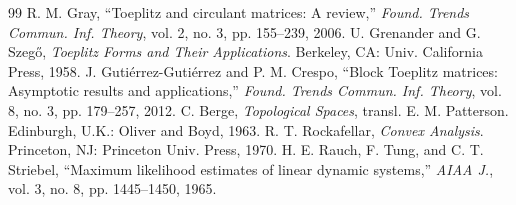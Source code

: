 \documentclass[11pt,onecolumn]{IEEEtran}
\begin{document}
\begin{thebibliography}{99}
 R. M. Gray, ``Toeplitz and circulant matrices: A
review,'' \emph{Found. Trends Commun. Inf. Theory}, vol. 2, no. 3,
pp. 155--239, 2006.
 U. Grenander and G. Szeg\H{o}, \emph{Toeplitz Forms
and Their Applications}. Berkeley, CA: Univ. California Press, 1958.
 J. Guti\'errez-Guti\'errez and P. M. Crespo, ``Block
Toeplitz matrices: Asymptotic results and applications,'' \emph{Found.
Trends Commun. Inf. Theory}, vol. 8, no. 3, pp. 179--257, 2012.
 C. Berge, \emph{Topological Spaces}, transl.
E. M. Patterson. Edinburgh, U.K.: Oliver and Boyd, 1963.
 R. T. Rockafellar, \emph{Convex Analysis}.
Princeton, NJ: Princeton Univ. Press, 1970.
 H. E. Rauch, F. Tung, and C. T. Striebel, ``Maximum
likelihood estimates of linear dynamic systems,'' \emph{AIAA J.}, vol. 3,
no. 8, pp. 1445--1450, 1965.
\end{thebibliography}
\end{document}
